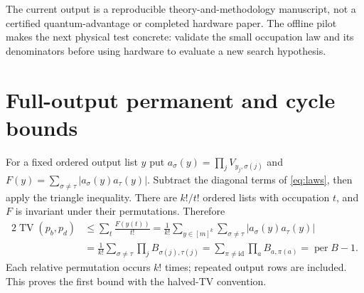 \documentclass[11pt,a4paper]{article}
\theoremstyle{remark}\newtheorem{remark}[theorem]{Remark}
\DeclareMathOperator{\TV}{TV}
\DeclareMathOperator{\per}{per}
\begin{document}
The current output is a reproducible theory-and-methodology manuscript, not a certified quantum-advantage or completed hardware paper. The offline pilot makes the next physical test concrete: validate the small occupation law and its denominators before using hardware to evaluate a new search hypothesis.



\appendix
\section{Full-output permanent and cycle bounds}\label{app:gram}
For a fixed ordered output list $y$ put $a_\sigma(y)=\prod_jV_{y_j,\sigma(j)}$ and $F(y)=\sum_{\sigma\ne\tau}|a_\sigma(y)a_\tau(y)|$. Subtract the diagonal terms of \cref{eq:laws}, then apply the triangle inequality. There are $k!/t!$ ordered lists with occupation $t$, and $F$ is invariant under their permutations. Therefore
\begin{align}
 2\TV(p_b,p_d)&\le\sum_t\frac{F(y(t))}{t!}
 =\frac1{k!}\sum_{y\in[m]^k}\sum_{\sigma\ne\tau}|a_\sigma(y)a_\tau(y)|\nonumber\\
 &=\frac1{k!}\sum_{\sigma\ne\tau}\prod_j B_{\sigma(j),\tau(j)}
 =\sum_{\pi\ne\mathrm{id}}\prod_a B_{a,\pi(a)}=\per B-1.
\end{align}
Each relative permutation occurs $k!$ times; repeated output rows are included. This proves the first bound with the halved-TV convention.
\end{document}
